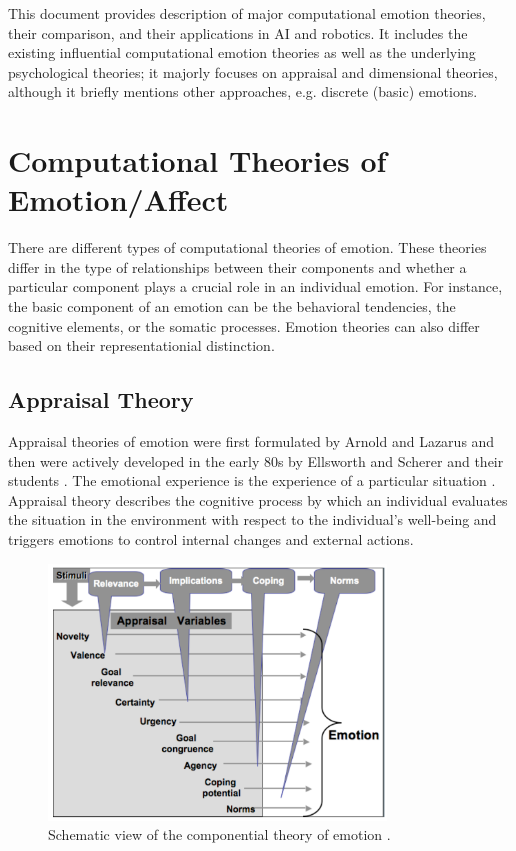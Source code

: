 \documentclass[11pt]{article}
\begin{document}
This document provides description of major computational emotion theories,
their comparison, and their applications in AI and robotics. It includes the
existing influential computational emotion theories as well as the underlying
psychological theories; it majorly focuses on appraisal and dimensional
theories, although it briefly mentions other approaches, e.g. discrete (basic)
emotions.

\section{Computational Theories of Emotion/Affect}
\label{sec:emotion-theories}

There are different types of computational theories of emotion. These theories
differ in the type of relationships between their components and whether a
particular component plays a crucial role in an individual emotion. For
instance, the basic component of an emotion can be the behavioral tendencies,
the cognitive elements, or the somatic processes. Emotion theories can also
differ based on their representationial distinction.

\subsection{Appraisal Theory}
\label{sec:appraisal-theory}

Appraisal theories of emotion were first formulated by Arnold
\cite{arnold:emotion-personality} and Lazarus \cite{lazarus:emotion-adaptation}
and then were actively developed in the early 80s by Ellsworth and Scherer and
their students \cite{roseman:appraisal-theory}
\cite{sander:systems-approach-appraisal} \cite{scherer:nature-function-emotion}
\cite{scherer:appraisal-processes} \cite{scherer:emotions-emergent}. The
emotional experience is the experience of a particular situation
\cite{frijda:emotions}. Appraisal theory describes the cognitive process by
which an individual evaluates the situation in the environment with respect to
the individual's well-being and triggers emotions to control internal changes
and external actions.

\begin{figure}[tbh]
  \center
  \includegraphics[width=0.8\textwidth]{figure/cpm.png}
  \caption{Schematic view of the componential theory of emotion
  \cite{hudlicka:guidelines-emotions}.}
  \label{fig:cpm}
\end{figure}
\end{document}
